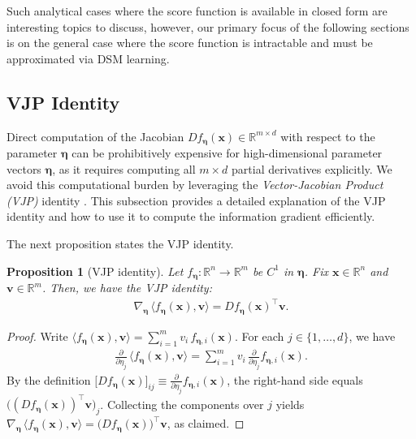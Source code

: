 \documentclass[conference]{IEEEtran}
\newtheorem{proposition}[theorem]{Proposition} %
\newcommand{\R}{\mathbb{R}}
\begin{document}
Such analytical cases where the score function is available in closed form are 
interesting topics to discuss, however, our primary focus of the following sections 
is on the general case where the score function is intractable and must be approximated 
via DSM learning.

\subsection{VJP Identity}
\label{subsec:vjp}

Direct computation of the Jacobian $D f_{\bm \eta}(\bm x) \in \R^{m \times d}$ 
with respect to the parameter $\bm \eta$
can be prohibitively expensive for high-dimensional parameter vectors $\bm \eta$, 
as it requires computing all $m \times d$ partial derivatives explicitly. 
We avoid this computational burden by leveraging 
the \emph{Vector-Jacobian Product (VJP)} identity \cite{Baydin2018}.
This subsection provides a detailed explanation of 
the VJP identity and how to use it to compute the information gradient efficiently.

The next proposition states the VJP identity.
\begin{proposition}[VJP identity]
\label{prop:vjp_identity}
Let $f_{\bm\eta}:\R^n\to\R^m$ be $C^1$ in $\bm\eta$. 
Fix $\bm x\in\R^n$ and $\bm v\in\R^m$. 
Then, we have the VJP identity:
\begin{align}
    \label{eq:vjp_identity}
\nabla_{\bm\eta}\,\langle f_{\bm\eta}(\bm x),\bm v\rangle
= D f_{\bm\eta}(\bm x)^{\!\top}\bm v .
\end{align}
\end{proposition}

\begin{proof}
Write $\langle f_{\bm\eta}(\bm x),\bm v\rangle=\sum_{i=1}^m v_i\,f_{\bm\eta,i}(\bm x)$.
For each $j\in\{1,\dots,d\}$, we have
\begin{align}
\frac{\partial}{\partial \eta_j}\,\langle f_{\bm\eta}(\bm x),\bm v\rangle
= \sum_{i=1}^m v_i\,\frac{\partial}{\partial \eta_j} f_{\bm\eta,i}(\bm x).
\end{align}
By the definition $\big[D f_{\bm\eta}(\bm x)\big]_{ij}
\equiv \frac{\partial}{\partial \eta_j} f_{\bm\eta,i}(\bm x)$, the right-hand side equals
$\big((D f_{\bm\eta}(\bm x))^{\!\top}\bm v\big)_j$.
Collecting the components over $j$ yields
$\nabla_{\bm\eta}\,\langle f_{\bm\eta}(\bm x),\bm v\rangle
= \big(D f_{\bm\eta}(\bm x)\big)^{\!\top}\bm v$, as claimed.
\end{proof}
\end{document}
